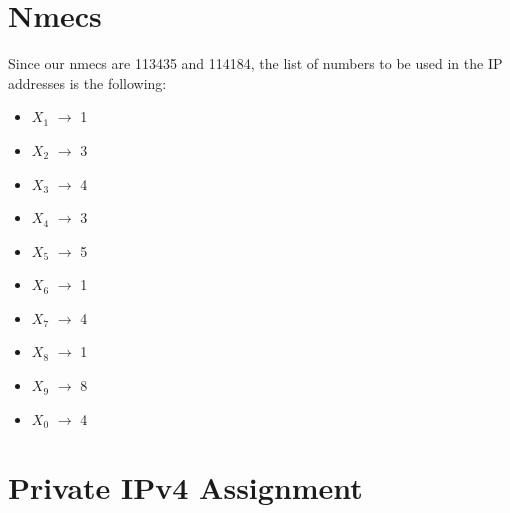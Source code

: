 \documentclass{report}
\begin{document}
\renewcommand{\headrulewidth}{0.5pt} %
\renewcommand{\footrulewidth}{0.5pt}
\pagestyle{plain}

\chapter*{Nmecs}
Since our nmecs are 113435 and 114184, the list of numbers to be used in the IP addresses is the following:

\begin{itemize}
    \item \textbf{$X_1$} $\rightarrow$ 1
    \item \textbf{$X_2$} $\rightarrow$ 3
    \item \textbf{$X_3$} $\rightarrow$ 4
    \item \textbf{$X_4$} $\rightarrow$ 3
    \item \textbf{$X_5$} $\rightarrow$ 5
    \item \textbf{$X_6$} $\rightarrow$ 1
    \item \textbf{$X_7$} $\rightarrow$ 4
    \item \textbf{$X_8$} $\rightarrow$ 1
    \item \textbf{$X_9$} $\rightarrow$ 8
    \item \textbf{$X_0$} $\rightarrow$ 4
\end{itemize}

\chapter*{Private IPv4 Assignment}
\end{document}
